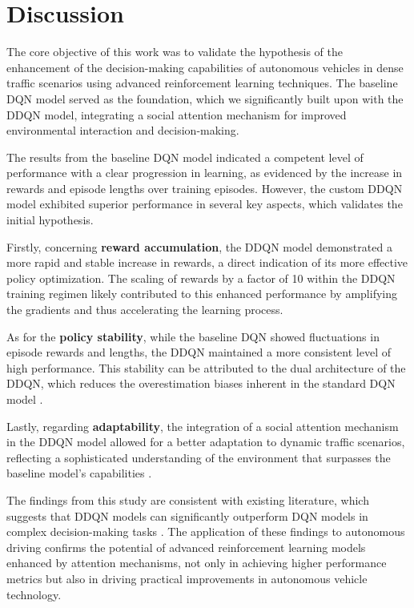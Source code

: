 \documentclass{article}
\begin{document}
\section{Discussion}

The core objective of this work was to validate the hypothesis of the enhancement of the decision-making capabilities of autonomous vehicles in dense traffic scenarios using advanced reinforcement learning techniques. The baseline DQN model served as the foundation, which we significantly built upon with the DDQN model, integrating a social attention mechanism for improved environmental interaction and decision-making.

The results from the baseline DQN model indicated a competent level of performance with a clear progression in learning, as evidenced by the increase in rewards and episode lengths over training episodes. However, the custom DDQN model exhibited superior performance in several key aspects, which validates the initial hypothesis.

Firstly, concerning \textbf{reward accumulation}, the DDQN model demonstrated a more rapid and stable increase in rewards, a direct indication of its more effective policy optimization. The scaling of rewards by a factor of 10 within the DDQN training regimen likely contributed to this enhanced performance by amplifying the gradients and thus accelerating the learning process.

As for the \textbf{policy stability}, while the baseline DQN showed fluctuations in episode rewards and lengths, the DDQN maintained a more consistent level of high performance. This stability can be attributed to the dual architecture of the DDQN, which reduces the overestimation biases inherent in the standard DQN model \citep{DBLP:journals/corr/HasseltGS15}.

Lastly, regarding \textbf{adaptability}, the integration of a social attention mechanism in the DDQN model allowed for a better adaptation to dynamic traffic scenarios, reflecting a sophisticated understanding of the environment that surpasses the baseline model's capabilities \citep{leurent2019social}.

The findings from this study are consistent with existing literature, which suggests that DDQN models can significantly outperform DQN models in complex decision-making tasks \citep{8500630}. The application of these findings to autonomous driving confirms the potential of advanced reinforcement learning models enhanced by attention mechanisms, not only in achieving higher performance metrics but also in driving practical improvements in autonomous vehicle technology.
\end{document}
